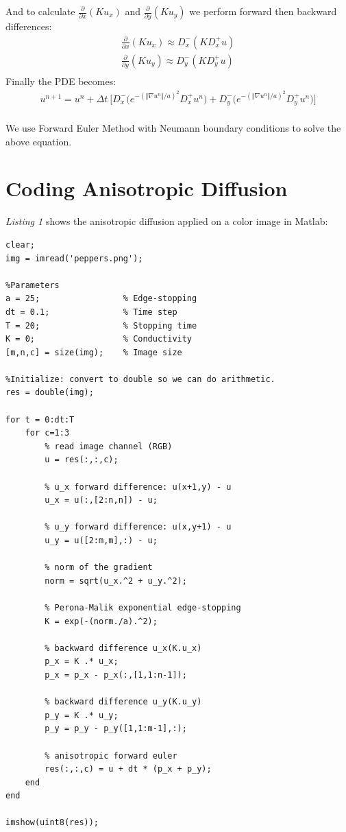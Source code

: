 \documentclass[a4paper,11pt]{article}
\begin{document}
And to calculate $\frac{\partial}{\partial x}(K u_x)$ and $\frac{\partial}{\partial y}(K u_y)$ we perform forward then backward differences:
\begin{align*}
\frac{\partial}{\partial x}(K u_x) \approx D_x^{-}(KD_x^{+}u) \\
\frac{\partial}{\partial y}(K u_y) \approx D_y^{-}(KD_y^{+}u) \\
\end{align*}
Finally the PDE becomes:
\begin{align*}
u^{n+1} = u^n + \Delta t\ \bigg[D_x^{-}\Big(e^{-(\Vert\nabla u^n\Vert/a)^2} D_x^{+}u^n\Big) + D_y^{-}\Big(e^{-(\Vert\nabla u^n\Vert/a)^2} D_y^{+}u^n\Big)\bigg]
\end{align*}
\\We use Forward Euler Method with Neumann boundary conditions to solve the above equation.

\newpage
\section*{Coding Anisotropic Diffusion}
\emph{Listing 1} shows the anisotropic diffusion applied on a color image in Matlab:
\begin{lstlisting}[caption={Anisotropic Diffusion for Color Images in Matlab},captionpos=b,style=Matlab-editor]
clear;
img = imread('peppers.png');

%Parameters
a = 25;                 % Edge-stopping
dt = 0.1;               % Time step
T = 20;                 % Stopping time
K = 0;                  % Conductivity
[m,n,c] = size(img);    % Image size

%Initialize: convert to double so we can do arithmetic.
res = double(img);

for t = 0:dt:T
    for c=1:3
        % read image channel (RGB)
        u = res(:,:,c);
        
        % u_x forward difference: u(x+1,y) - u
        u_x = u(:,[2:n,n]) - u;
        
        % u_y forward difference: u(x,y+1) - u
        u_y = u([2:m,m],:) - u;
        
        % norm of the gradient
        norm = sqrt(u_x.^2 + u_y.^2);
        
        % Perona-Malik exponential edge-stopping
        K = exp(-(norm./a).^2);

        % backward difference u_x(K.u_x)
        p_x = K .* u_x;
        p_x = p_x - p_x(:,[1,1:n-1]);       

        % backward difference u_y(K.u_y)
        p_y = K .* u_y;
        p_y = p_y - p_y([1,1:m-1],:);

        % anisotropic forward euler
        res(:,:,c) = u + dt * (p_x + p_y);
    end
end

imshow(uint8(res)); 

\end{lstlisting}
\end{document}
